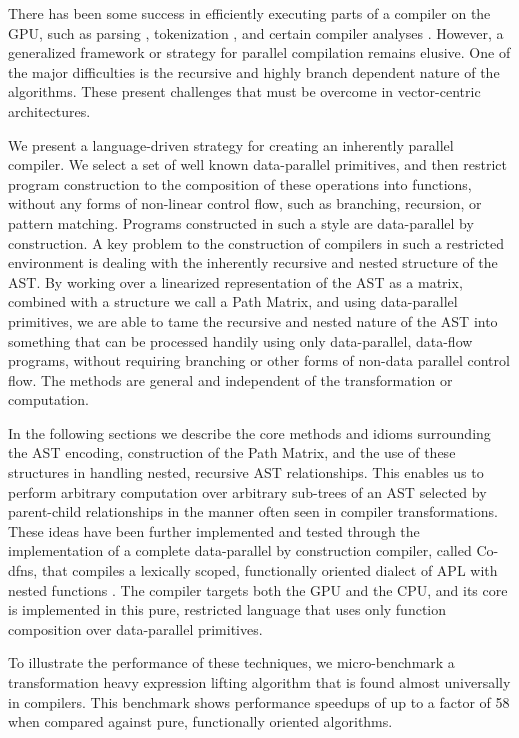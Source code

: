 ﻿\documentclass[numbers,10pt,preprint]{sigplanconf}
\begin{document}
There has been some success in efficiently executing parts of a compiler on the GPU, such as parsing \cite{bunda1984apl}, tokenization \cite{bernecky2003tokenizer}, and certain compiler analyses \cite{prabhu2011eigencfa,mendez2012inclusion}. However, a generalized framework or strategy for parallel compilation remains elusive. One of the major difficulties is the recursive and highly branch dependent nature of the algorithms. These present challenges that must be overcome in vector-centric architectures.

We present a language-driven strategy for creating an inherently parallel compiler. We select a set of well known data-parallel primitives, and then restrict program construction to the composition of these operations into functions, without any forms of non-linear control flow, such as branching, recursion, or pattern matching. Programs constructed in such a style are data-parallel by construction. A key problem to the construction of compilers in such a restricted environment is dealing with the inherently recursive and nested structure of the AST. By working over a linearized representation of the AST as a matrix, combined with a structure we call a Path Matrix, and using data-parallel primitives, we are able to tame the recursive and nested nature of the AST into something that can be processed handily using only data-parallel, data-flow programs, without requiring branching or other forms of non-data parallel control flow. The methods are general and independent of the transformation or computation.

In the following sections we describe the core methods and idioms surrounding the AST encoding, construction of the Path Matrix, and the use of these structures in handling nested, recursive AST relationships. This enables us to perform arbitrary computation over arbitrary sub-trees of an AST selected by parent-child relationships in the manner often seen in compiler transformations. These ideas have been further implemented and tested through the implementation of a complete data-parallel by construction compiler, called Co-dfns, that compiles a lexically scoped, functionally oriented dialect of APL with nested functions \cite{hsu2014co,hsu2015accelerating}. The compiler targets both the GPU and the CPU, and its core is implemented in this pure, restricted language that uses only function composition over data-parallel primitives.

To illustrate the performance of these techniques, we micro-benchmark a transformation heavy expression lifting algorithm that is found almost universally in compilers. This benchmark shows performance speedups of up to a factor of 58 when compared against pure, functionally oriented algorithms.
\end{document}
